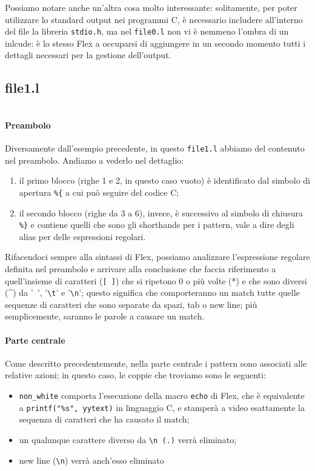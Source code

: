 \documentclass[class=book, crop=false, oneside, 12pt]{standalone}
\begin{document}
Possiamo notare anche un'altra cosa molto interessante: solitamente, per poter utilizzare lo standard output nei programmi C, è necessario includere all'interno del file la libreria \texttt{stdio.h}, ma nel \texttt{file0.l} non vi è nemmeno l'ombra di un inlcude: è lo stesso Flex a occuparsi di aggiungere in un secondo momento tutti i dettagli necessari per la gestione dell'output.

\subsection*{file1.l}

\inputminted[linenos, breaklines, tabsize = 2]{c}{assets/code-fragments/file1.l}%

\paragraph{Preambolo}
Diversamente dall'esempio precedente, in questo \texttt{file1.l} abbiamo del contenuto nel preambolo. Andiamo a vederlo nel dettaglio:

\begin{enumerate}
    \item il primo blocco (righe 1 e 2, in questo caso vuoto) è identificato dal simbolo di apertura \texttt{\%\{} a cui può seguire del codice C;
    \item il secondo blocco (righe da 3 a 6), invece, è successivo al simbolo di chiusura \texttt{\%\}} e contiene quelli che sono gli shorthands per i pattern, vale a dire degli alias per delle espressioni regolari.
\end{enumerate}

Rifacendoci sempre alla sintassi di Flex, possiamo analizzare l'espressione regolare definita nel preambolo e arrivare alla conclusione che faccia riferimento a quell'insieme di caratteri (\texttt{[ ]}) che si ripetono \(0\) o più volte (*) e che sono diversi (\^{}) da '\texttt{ }', '\texttt{\textbackslash t}' e '\texttt{\textbackslash n}'; questo significa che comporteranno un match tutte quelle sequenze di caratteri che sono separate da spazi, tab o new line; più semplicemente, saranno le parole a causare un match.

\paragraph{Parte centrale}
Come descritto precedentemente, nella parte centrale i pattern sono associati alle relative azioni; in questo caso, le coppie che troviamo sono le seguenti:
\begin{itemize}
    \item \texttt{non\_white} comporta l'esecuzione della macro \texttt{echo} di Flex, che è equivalente a \texttt{printf("\%s", yytext)} in linguaggio C, e stamperà a video esattamente la sequenza di caratteri che ha causato il match;
    \item un qualunque carattere diverso da \texttt{\textbackslash n (.)} verrà eliminato;
    \item new line (\texttt{\textbackslash n}) verrà anch'esso eliminato
\end{itemize}
\end{document}
